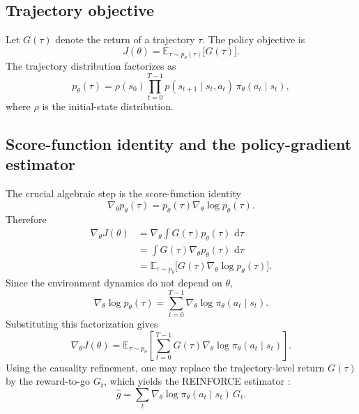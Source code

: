 \documentclass[11pt]{article}
\newcommand{\E}{\mathbb{E}}
\newcommand{\1}{\mathbf{1}}
\newcommand{\dd}{\,\mathrm{d}}
\begin{document}
\subsection{Trajectory objective}

Let $G(\tau)$ denote the return of a trajectory $\tau$. The policy objective is
\begin{equation}
J(\theta)=\E_{\tau\sim p_\theta(\tau)}\bigl[G(\tau)\bigr].
\end{equation}
The trajectory distribution factorizes as
\begin{equation}
p_\theta(\tau)=\rho(s_0)\prod_{t=0}^{T-1} p(s_{t+1}\mid s_t,a_t)\,\pi_\theta(a_t\mid s_t),
\end{equation}
where $\rho$ is the initial-state distribution.

\subsection{Score-function identity and the policy-gradient estimator}

The crucial algebraic step is the score-function identity
\begin{equation}
\nabla_\theta p_\theta(\tau)=p_\theta(\tau)\nabla_\theta\log p_\theta(\tau).
\end{equation}
Therefore
\begin{align}
\nabla_\theta J(\theta)
&= \nabla_\theta \int G(\tau)p_\theta(\tau)\,\dd\tau \\
&= \int G(\tau)\nabla_\theta p_\theta(\tau)\,\dd\tau \\
&= \E_{\tau\sim p_\theta}\bigl[G(\tau)\nabla_\theta\log p_\theta(\tau)\bigr].
\end{align}
Since the environment dynamics do not depend on $\theta$,
\begin{equation}
\nabla_\theta \log p_\theta(\tau)=\sum_{t=0}^{T-1}\nabla_\theta\log\pi_\theta(a_t\mid s_t).
\end{equation}
Substituting this factorization gives
\begin{equation}
\nabla_\theta J(\theta)=\E_{\tau\sim p_\theta}\left[\sum_{t=0}^{T-1} G(\tau)\nabla_\theta\log\pi_\theta(a_t\mid s_t)\right].
\end{equation}
Using the causality refinement, one may replace the trajectory-level return $G(\tau)$ by the reward-to-go $G_t$, which yields the REINFORCE estimator \cite{Williams1992}:
\begin{equation}
\hat g = \sum_t \nabla_\theta\log\pi_\theta(a_t\mid s_t)\,G_t.
\end{equation}
\end{document}
